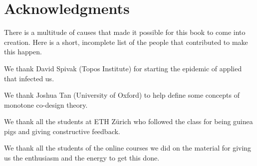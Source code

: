
\section{Acknowledgments}

There is a multitude of causes that made it possible for this book to come into creation.
Here is a short, incomplete list of the people that contributed to make this happen.

We thank David Spivak (Topos Institute) for starting the epidemic of applied  that infected us.

We thank Joshua Tan (University of Oxford) to help define some concepts of monotone co-design theory.

We thank all the students at ETH Zürich who followed the class for being guinea pigs and giving constructive feedback.

We thank all the students of the online courses we did on the material for giving us the enthusiasm and the energy to get this done.

